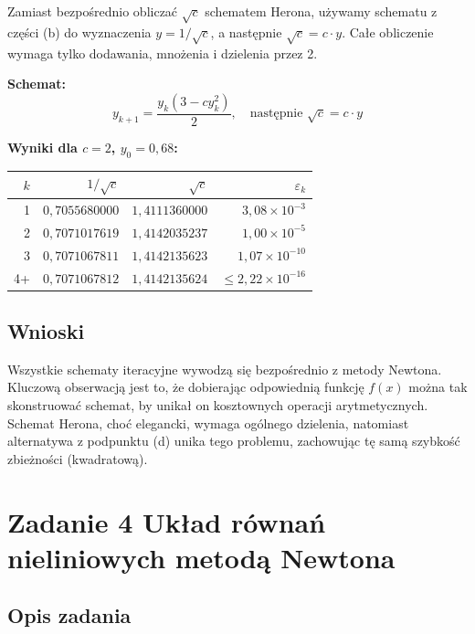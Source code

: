\documentclass[12pt, a4paper]{article}
\begin{document}
Zamiast bezpośrednio obliczać $\sqrt{c}$ schematem Herona, używamy schematu z części (b) do wyznaczenia $y = 1/\sqrt{c}$, a następnie $\sqrt{c} = c \cdot y$. Całe obliczenie wymaga tylko dodawania, mnożenia i dzielenia przez 2.

\textbf{Schemat:}
\[
  y_{k+1} = \frac{y_k(3 - cy_k^2)}{2}, \quad \text{następnie } \sqrt{c} = c \cdot y
\]

\textbf{Wyniki dla $c = 2$, $y_0 = 0{,}68$:}

\begin{center}
\begin{tabular}{r|r|r|r}
\toprule
$k$ & $1/\sqrt{c}$ & $\sqrt{c}$ & $\varepsilon_k$ \\
\midrule
1 & $0{,}7055680000$ & $1{,}4111360000$ & $3{,}08 \times 10^{-3}$ \\
2 & $0{,}7071017619$ & $1{,}4142035237$ & $1{,}00 \times 10^{-5}$ \\
3 & $0{,}7071067811$ & $1{,}4142135623$ & $1{,}07 \times 10^{-10}$ \\
4+ & $0{,}7071067812$ & $1{,}4142135624$ & $\leq 2{,}22 \times 10^{-16}$ \\
\bottomrule
\end{tabular}
\end{center}

\subsection{Wnioski}

Wszystkie schematy iteracyjne wywodzą się bezpośrednio z metody Newtona. Kluczową obserwacją jest to, że dobierając odpowiednią funkcję $f(x)$ można tak skonstruować schemat, by unikał on kosztownych operacji arytmetycznych. Schemat Herona, choć elegancki, wymaga ogólnego dzielenia, natomiast alternatywa z podpunktu (d) unika tego problemu, zachowując tę samą szybkość zbieżności (kwadratową).

\section{Zadanie 4 \textendash{} Układ równań nieliniowych metodą Newtona}

\subsection{Opis zadania}
\end{document}
